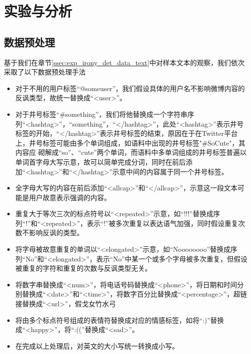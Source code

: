 \section{实验与分析}
\label{sec:exp_irony_det_exp}

\subsection{数据预处理}

基于我们在章节\ref{ssec:exp_irony_det_data_text}中对样本文本的观察，我们依次采取了以下数据预处理手法

\begin{itemize}

\item 对于不用的用户标签“@someuser”，我们假设具体的用户名不影响微博内容的反讽类型，故统一替换成“<user>”。

\item 对于井号标签“\#something”，我们将他替换成一个字符串序列“<hashtag>”，“something”，“</hashtag>”，此处“<hashtag>”表示井号标签的开始，“</hashtag>”表示井号标签的结束，原因在于在Twitter平台上，井号标签可能由多个单词组成，如语料中出现的井号标签"\#SoCute"，其内容应
砌解成“so”、“cute”两个单词，而语料中多单词组成的井号标签普遍以单词首字母大写示意，故可以简单完成分词，同时在前后添加“<hashtag>”和“</hashtag>”示意中间的内容属于同一个井号标签。

\item 全字母大写的内容在前后添加“<allcap>”和“</allcap>”，示意这一段文本可能是用户故意表示强调的内容。

\item 重复大于等次三次的标点符号以“<repeated>”示意，如“!!!”替换成序列“!”和“<repeated>”，表示“!”被多次重复以表达语气加强，同时假设重复次数不影响反讽的类型。

\item 将字母被故意重复的单词以“<elongated>”示意，如“Noooooooo”替换成序列“No”和“<elongated>”，表示“No”中某一个或多个字母被多次重复，但假设被重复的字符和重复的次数与反讽类型无关。

\item 将数字串替换成“<num>”，将电话号码替换成“<phone>”，将日期和时间分别替换成“<date>”和“<time>”，将数字百分比替换成“<percentage>”，超链接替换成“<url>”，假戈女竹水弓

\item 将由多个标点符号组成的表情符替换成对应的情感标签，如将“:)”替换成“<happy>”，将“:((”替换成“<sad>”。

\item 在完成以上处理后，对英文的大小写统一转换成小写。

\end{itemize}


